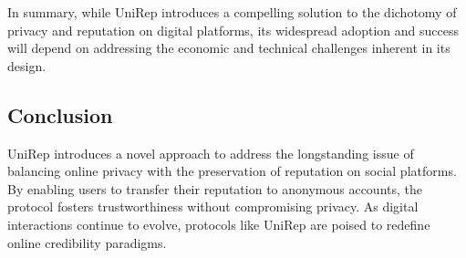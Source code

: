 \documentclass[11pt]{article}
\begin{document}
In summary, while UniRep introduces a compelling solution to the dichotomy of privacy and reputation on digital platforms, its widespread adoption and success will depend on addressing the economic and technical challenges inherent in its design.
\subsection{Conclusion}
\label{sec:orgdd06de9}

UniRep introduces a novel approach to address the longstanding issue of balancing online privacy with the preservation of reputation on social platforms. By enabling users to transfer their reputation to anonymous accounts, the protocol fosters trustworthiness without compromising privacy. As digital interactions continue to evolve, protocols like UniRep are poised to redefine online credibility paradigms.
\end{document}
